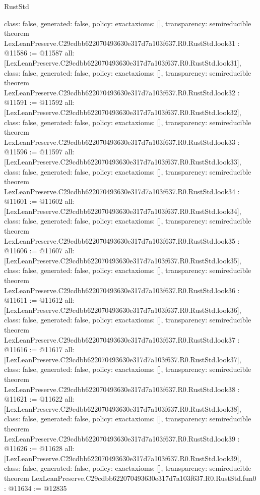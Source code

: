 \begin{lexlean}{RustStd}
\begin{coremodule}
{  class: false,
  generated: false,
  policy: exact{axioms: []},
  transparency: semireducible
}
theorem LexLeanPreserve.C29cdbb622070493630e317d7a103f637.R0.RustStd.look31 : @11586 := @11587 {
  all: [LexLeanPreserve.C29cdbb622070493630e317d7a103f637.R0.RustStd.look31],
  class: false,
  generated: false,
  policy: exact{axioms: []},
  transparency: semireducible
}
theorem LexLeanPreserve.C29cdbb622070493630e317d7a103f637.R0.RustStd.look32 : @11591 := @11592 {
  all: [LexLeanPreserve.C29cdbb622070493630e317d7a103f637.R0.RustStd.look32],
  class: false,
  generated: false,
  policy: exact{axioms: []},
  transparency: semireducible
}
theorem LexLeanPreserve.C29cdbb622070493630e317d7a103f637.R0.RustStd.look33 : @11596 := @11597 {
  all: [LexLeanPreserve.C29cdbb622070493630e317d7a103f637.R0.RustStd.look33],
  class: false,
  generated: false,
  policy: exact{axioms: []},
  transparency: semireducible
}
theorem LexLeanPreserve.C29cdbb622070493630e317d7a103f637.R0.RustStd.look34 : @11601 := @11602 {
  all: [LexLeanPreserve.C29cdbb622070493630e317d7a103f637.R0.RustStd.look34],
  class: false,
  generated: false,
  policy: exact{axioms: []},
  transparency: semireducible
}
theorem LexLeanPreserve.C29cdbb622070493630e317d7a103f637.R0.RustStd.look35 : @11606 := @11607 {
  all: [LexLeanPreserve.C29cdbb622070493630e317d7a103f637.R0.RustStd.look35],
  class: false,
  generated: false,
  policy: exact{axioms: []},
  transparency: semireducible
}
theorem LexLeanPreserve.C29cdbb622070493630e317d7a103f637.R0.RustStd.look36 : @11611 := @11612 {
  all: [LexLeanPreserve.C29cdbb622070493630e317d7a103f637.R0.RustStd.look36],
  class: false,
  generated: false,
  policy: exact{axioms: []},
  transparency: semireducible
}
theorem LexLeanPreserve.C29cdbb622070493630e317d7a103f637.R0.RustStd.look37 : @11616 := @11617 {
  all: [LexLeanPreserve.C29cdbb622070493630e317d7a103f637.R0.RustStd.look37],
  class: false,
  generated: false,
  policy: exact{axioms: []},
  transparency: semireducible
}
theorem LexLeanPreserve.C29cdbb622070493630e317d7a103f637.R0.RustStd.look38 : @11621 := @11622 {
  all: [LexLeanPreserve.C29cdbb622070493630e317d7a103f637.R0.RustStd.look38],
  class: false,
  generated: false,
  policy: exact{axioms: []},
  transparency: semireducible
}
theorem LexLeanPreserve.C29cdbb622070493630e317d7a103f637.R0.RustStd.look39 : @11626 := @11628 {
  all: [LexLeanPreserve.C29cdbb622070493630e317d7a103f637.R0.RustStd.look39],
  class: false,
  generated: false,
  policy: exact{axioms: []},
  transparency: semireducible
}
theorem LexLeanPreserve.C29cdbb622070493630e317d7a103f637.R0.RustStd.fun0 : @11634 := @12835 {
}
\end{coremodule}
\end{lexlean}
